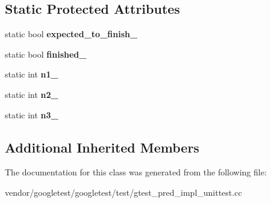 \subsection*{Static Protected Attributes}
\begin{DoxyCompactItemize}
\item 
\mbox{\label{class_predicate3_test_a42c11555410ee89bf6e59d39336a212c}} 
static bool {\bfseries expected\+\_\+to\+\_\+finish\+\_\+}
\item 
\mbox{\label{class_predicate3_test_aa2ef0fa6aed09d872fb9ae36961b49eb}} 
static bool {\bfseries finished\+\_\+}
\item 
\mbox{\label{class_predicate3_test_ac232320a93f0c1e09886148a3e1929a5}} 
static int {\bfseries n1\+\_\+}
\item 
\mbox{\label{class_predicate3_test_a11049ef16bcaadc8262faf7349c7676e}} 
static int {\bfseries n2\+\_\+}
\item 
\mbox{\label{class_predicate3_test_afc1df6b079ffe22b87479b161d2ad2f7}} 
static int {\bfseries n3\+\_\+}
\end{DoxyCompactItemize}
\subsection*{Additional Inherited Members}


The documentation for this class was generated from the following file\+:\begin{DoxyCompactItemize}
\item 
vendor/googletest/googletest/test/gtest\+\_\+pred\+\_\+impl\+\_\+unittest.\+cc\end{DoxyCompactItemize}
